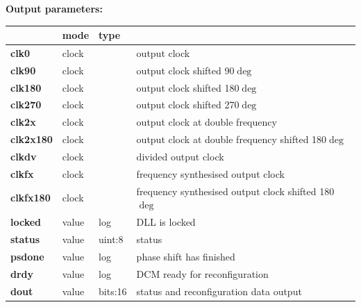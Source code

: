             {\bf Output parameters:} \\
            \begin{tabular}{| l | l | l | l |}
            \hline
                           & mode  & type   & \\
            \hline \hline
            {\bf clk0}     & clock &         & output clock \\ \hline
            {\bf clk90}    & clock &         & output clock shifted 90$\deg$ \\ \hline
            {\bf clk180}   & clock &         & output clock shifted 180$\deg$ \\ \hline
            {\bf clk270}   & clock &         & output clock shifted 270$\deg$ \\ \hline
            {\bf clk2x}    & clock &         & output clock at double frequency \\ \hline
            {\bf clk2x180} & clock &         & output clock at double frequency shifted 180$\deg$ \\ \hline
            {\bf clkdv}    & clock &         & divided output clock \\ \hline
            {\bf clkfx}    & clock &         & frequency synthesised output clock \\ \hline
            {\bf clkfx180} & clock &         & frequency synthesised output clock shifted 180$\deg$ \\ \hline
            {\bf locked}   & value & log     & DLL is locked \\ \hline
            {\bf status}   & value & uint:8  & status \\ \hline
            {\bf psdone}   & value & log     & phase shift has finished \\ \hline
            {\bf drdy}     & value & log     & DCM ready for reconfiguration \\ \hline
            {\bf dout}     & value & bits:16 & status and reconfiguration data output \\ \hline
            \end{tabular}

